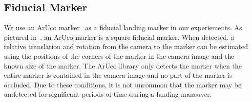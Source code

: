 
\subsection{Fiducial Marker}
We use an ArUco marker~\cite{romero2018speeded} as a fiducial landing marker
in our experiements. As pictured in~, an ArUco
marker is a square fiducial marker. When detected, a relative translation and
rotation from the camera to the marker can be estimated using the positions of
the corners of the marker in the camera image and the known size of the marker. 
The ArUco library only detects the marker when the entire marker is contained
in the camera image and no part of the marker is occluded. Due to these
conditions, it is not uncommon that the marker may be undetected for significant
periods of time during a landing maneuver.


